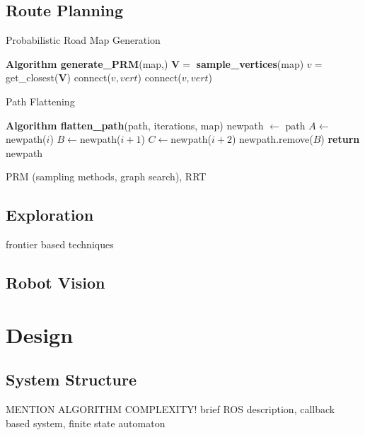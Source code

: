 \documentclass[conference]{IEEEtran}
\begin{document}
\subsection{Route Planning}
\begin{algorithm}
  \caption{Probabilistic Road Map Generation}
  \label{alg:prm}
  \begin{algorithmic}[1]
    \State \textbf{Algorithm generate\_PRM}\textnormal{(map,)}
    \State $\mathbf{V} = $\textbf{ sample\_vertices}\textnormal{(map)}
    \State $v =$\textnormal{get\_closest($\mathbf{V}$)}
    \State \textnormal{connect($v, vert$)}
    \EndIf
    \Else
    \State \textnormal{connect($v,vert$)}
    \EndIf
    \EndIf
    \EndIf
    \EndWhile
  \end{algorithmic}
\end{algorithm}
\begin{algorithm}
  \caption{Path Flattening}
  \label{alg:pathflat}
  \begin{algorithmic}[1]
    \State \textbf{Algorithm flatten\_path}\textnormal{(path, iterations, map)}
    \State \textnormal{newpath $\gets$ path}
    \State $A \gets $\textnormal{newpath($i$)}
    \State $B \gets $\textnormal{newpath($i+1$)}
    \State $C \gets $\textnormal{newpath($i+2$)}
    \State \textnormal{newpath.remove($B$)}
    \EndIf
    \EndFor
    \EndFor
    \State \textbf{return}\textnormal{ newpath}
  \end{algorithmic}
\end{algorithm}
PRM (sampling methods, graph search), RRT
\subsection{Exploration}
frontier based techniques
\subsection{Robot Vision}
\section{Design}
\subsection{System Structure}
MENTION ALGORITHM COMPLEXITY!
brief ROS description, callback based system, finite state automaton
\end{document}
